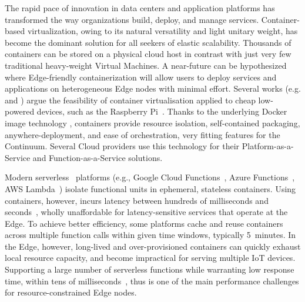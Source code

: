 The rapid pace of innovation in data centers and application platforms has transformed the way organizations build, deploy, and manage services.
Container-based virtualization, owing to its natural versatility and light unitary weight, has become the dominant solution for all seekers of elastic scalability.
Thousands of containers can be stored on a physical cloud host in contrast with just very few traditional heavy-weight Virtual Machines. 
A near-future can be hypothesized where Edge-friendly containerization will allow users to deploy services and applications on heterogeneous Edge nodes with minimal effort. 
Several works (e.g. \cite{pahl2016container} and \cite{bellavista2017feasibility}) argue the feasibility of container virtualisation applied to cheap low-powered devices, such as the Raspberry Pi~\cite{raspberry}.
Thanks to the underlying Docker image technology \cite{docker-image}, containers provide resource isolation, self-contained packaging, anywhere-deployment, and ease of orchestration, very fitting features for the Continuum.
Several Cloud providers use this technology for their Platform-as-a-Service and Function-as-a-Service solutions.

Modern serverless~\cite{jonas2019cloud} platforms (e.g., Google Cloud Functions~\cite{gcloud-functions}, Azure Functions~\cite{azure-functions}, AWS Lambda~\cite{aws-lambda}) isolate functional units in ephemeral, stateless containers. 
Using containers, however, incurs latency between hundreds of milliseconds and seconds~\cite{mohanty2018evaluation}, wholly unaffordable for latency-sensitive services that operate at the Edge. 
To achieve better efficiency, some platforms cache and reuse containers across multiple function calls within given time windows, typically 5~minutes. 
In the Edge, however, long-lived and over-provisioned containers can quickly exhaust local resource capacity, and become impractical for serving multiple IoT devices. 
Supporting a large number of serverless functions while warranting low response time, within tens of milliseconds~\cite{elbamby2019wireless}, thus is one of the main performance challenges for resource-constrained Edge nodes.

